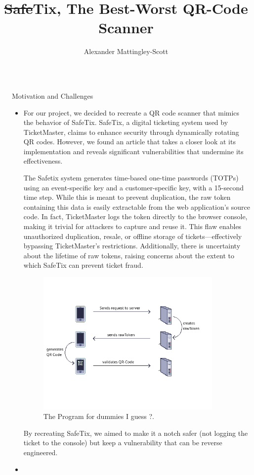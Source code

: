 \documentclass[final,dvipsnames]{beamer}
\title{\sout{Safe}Tix, The Best-Worst QR-Code Scanner}
\author{ \inst{1} \and Alexander Mattingley-Scott \inst{1}}
\institute[shortinst]{\inst{1} Heidelberg University}
\newlength{\sepwidth}
\newlength{\colwidth}
\newcommand{\separatorcolumn}{\begin{column}{\sepwidth}\end{column}}
\begin{document}
\begin{frame}[t, fragile]
\begin{columns}[t]
\separatorcolumn

\begin{column}{\colwidth}

	\begin{block}{Motivation and Challenges}

		\begin{itemize}
			\item For our project, we decided to recreate a QR code scanner that mimics the behavior of SafeTix. 
			SafeTix, a digital ticketing system used by TicketMaster, claims to enhance security through dynamically rotating QR codes. 
			However, we found an article that takes a closer look at its implementation and reveals significant vulnerabilities that undermine its effectiveness.

			The Safetix system generates time-based one-time passwords (TOTPs) using an event-specific key and a customer-specific key, with a 15-second time step. 
			While this is meant to prevent duplication, the raw token containing this data is easily extractable from the web application’s source code. 
			In fact, TicketMaster logs the token directly to the browser console, making it trivial for attackers to capture and reuse it.
			This flaw enables unauthorized duplication, resale, or offline storage of tickets—effectively bypassing TicketMaster’s restrictions. 
			Additionally, there is uncertainty about the lifetime of raw tokens, raising concerns about the extent to which SafeTix can prevent ticket fraud.
			\begin{figure}[h] %
				\centering
				\includegraphics[width=0.9\textwidth]{Image_1.png} %
				\caption{The Program for dummies I guess ?.}
				\label{fig:sample}
			\end{figure}
			By recreating SafeTix, we aimed to make it a notch safer (not logging the ticket to the console) but keep a vulnerability that can be reverse engineered. 
			\item 
		\end{itemize}


\end{block}
\end{column}
\end{columns}
\end{frame}
\end{document}
